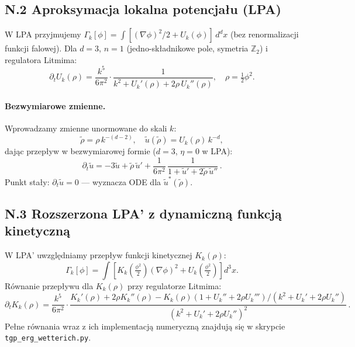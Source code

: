 \subsection*{N.2 Aproksymacja lokalna potencjału (LPA)}

W LPA przyjmujemy $\Gamma_k[\phi] = \int [(\nabla\phi)^2/2 + U_k(\phi)]\,d^dx$
(bez renormalizacji funkcji falowej). Dla $d = 3$, $n = 1$
(jedno-składnikowe pole, symetria $\mathbb{Z}_2$) i regulatora Litmima:
\begin{equation}
  \partial_t U_k(\rho) =
    \frac{k^5}{6\pi^2}
    \cdot\frac{1}{k^2 + U_k'(\rho) + 2\rho\,U_k''(\rho)},
  \quad \rho = \tfrac{1}{2}\phi^2.
  \label{eq:LPA_flow}
\end{equation}

\paragraph{Bezwymiarowe zmienne.}
Wprowadzamy zmienne unormowane do skali $k$:
\begin{equation}
  \tilde\rho = \rho\,k^{-(d-2)},
  \quad \tilde u(\tilde\rho) = U_k(\rho)\,k^{-d},
  \label{eq:dimensionless_vars}
\end{equation}
dając przepływ w bezwymiarowej formie ($d = 3$, $\eta = 0$ w LPA):
\begin{equation}
  \partial_t \tilde u =
    -3\tilde u + \tilde\rho\,\tilde u'
    + \frac{1}{6\pi^2}\,\frac{1}{1 + \tilde u' + 2\tilde\rho\,\tilde u''}\,.
  \label{eq:LPA_dimensionless}
\end{equation}
Punkt stały: $\partial_t \tilde u = 0$ — wyznacza ODE dla
$\tilde u^*(\tilde\rho)$.

\subsection*{N.3 Rozszerzona LPA' z dynamiczną funkcją kinetyczną}

W LPA' uwzględniamy przepływ funkcji kinetycznej $K_k(\rho)$:
\begin{equation}
  \Gamma_k[\phi] = \int\!\left[
    K_k\!\left(\tfrac{\phi^2}{2}\right)(\nabla\phi)^2 + U_k\!\left(\tfrac{\phi^2}{2}\right)
  \right]d^3x.
  \label{eq:LPA_prime_ansatz}
\end{equation}
Równanie przepływu dla $K_k(\rho)$ przy regulatorze Litmima:
\begin{equation}
  \partial_t K_k(\rho) =
    \frac{k^5}{6\pi^2}\cdot
    \frac{K_k'(\rho) + 2\rho K_k''(\rho) - K_k(\rho)(1 + U_k'' + 2\rho U_k''')
          /(k^2 + U_k' + 2\rho U_k'')}{(k^2 + U_k' + 2\rho U_k'')^2}\,.
  \label{eq:LPA_prime_K_flow}
\end{equation}
Pełne równania wraz z ich implementacją numeryczną znajdują się w skrypcie
\texttt{tgp\_erg\_wetterich.py}.

